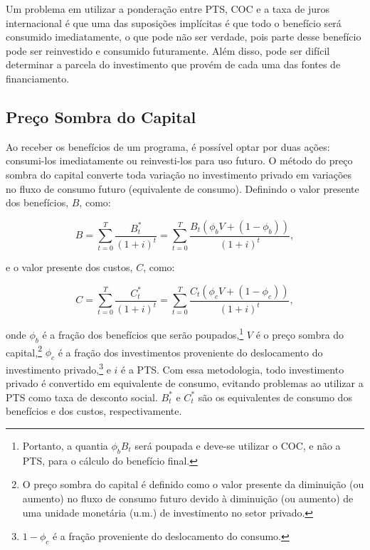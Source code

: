 \documentclass[12pt,letterpaper]{article}
\newcommand{\1}{\mathbbm{1}}
\numberwithin{equation}{section}
\begin{document}
Um problema em utilizar a ponderação entre PTS, COC e a taxa de juros internacional é que uma das suposições implícitas é que todo o benefício será consumido imediatamente, o que pode não ser verdade, pois parte desse benefício pode ser reinvestido e consumido futuramente. Além disso, pode ser difícil determinar a parcela do investimento que provém de cada uma das fontes de financiamento.

\subsection{Preço Sombra do Capital}

Ao receber os benefícios de um programa, é possível optar por duas ações: consumi-los imediatamente ou reinvesti-los para uso futuro. O método do preço sombra do capital converte toda variação no investimento privado em variações no fluxo de consumo futuro (equivalente de consumo). Definindo o valor presente dos benefícios, $B$, como:

\begin{equation}
    B = \sum_{t=0}^{T}\frac{B_{t}^{*}}{(1+i)^{t}}=\sum_{t=0}^{T}\frac{B_{t}(\phi_{b}V+(1-\phi_{b}))}{(1+i)^{t}},
\end{equation}

\noindent e o valor presente dos custos, $C$, como:

\begin{equation}
    C = \sum_{t=0}^{T}\frac{C_{t}^{*}}{(1+i)^{t}}=\sum_{t=0}^{T}\frac{C_{t}(\phi_{c}V+(1-\phi_{c}))}{(1+i)^{t}},
\end{equation}

\noindent onde $\phi_{b}$ é a fração dos benefícios que serão poupados,\footnote{Portanto, a quantia $\phi_{b}B_{t}$ será poupada e deve-se utilizar o COC, e não a PTS, para o cálculo do benefício final.} $V$ é o preço sombra do capital,\footnote{O preço sombra do capital é definido como o valor presente da diminuição (ou aumento) no fluxo de consumo futuro devido à diminuição (ou aumento) de uma unidade monetária (u.m.) de investimento no setor privado.} $\phi_{c}$ é a fração dos investimentos proveniente do deslocamento do investimento privado,\footnote{$1-\phi_{c}$ é a fração proveniente do deslocamento do consumo.} e $i$ é a PTS. Com essa metodologia, todo investimento privado é convertido em equivalente de consumo, evitando problemas ao utilizar a PTS como taxa de desconto social. $B_{t}^{*}$ e $C_{t}^{*}$ são os equivalentes de consumo dos benefícios e dos custos, respectivamente.
\end{document}
